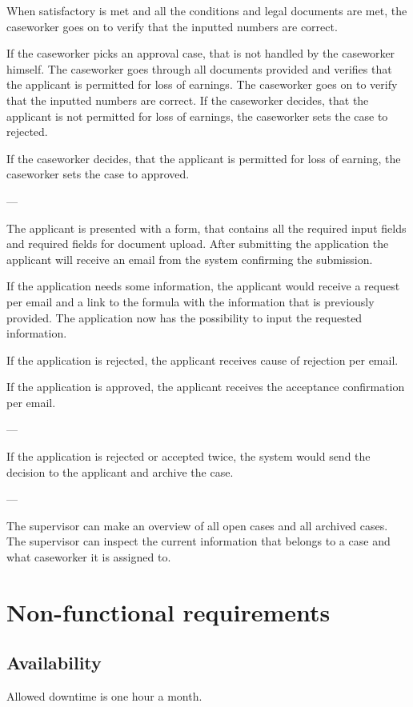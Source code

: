\documentclass{article}
\begin{document}
When satisfactory is met and all the conditions and legal documents are met, the caseworker goes on to verify that the inputted numbers are correct.

If the caseworker picks an approval case, that is not handled by the caseworker himself. The caseworker goes through all documents provided and verifies that the applicant is permitted for loss of earnings. The caseworker goes on to verify that the inputted numbers are correct.
If the caseworker decides, that the applicant is not permitted for loss of earnings, the caseworker sets the case to rejected.

If the caseworker decides, that the applicant is permitted for loss of earning, the caseworker sets the case to approved.

---

The applicant is presented with a form, that contains all the required input fields and required fields for document upload. After submitting the application the applicant will receive an email from the system confirming the submission.

If the application needs some information, the applicant would receive a request per email and a link to the formula with the information that is previously provided. The application now has the possibility to input the requested information. 

If the application is rejected, the applicant receives cause of rejection per email.

If the application is approved, the applicant receives the acceptance confirmation per email. 

---

If the application is rejected or accepted twice, the system would send the decision to the applicant and archive the case. 

---

The supervisor can make an overview of all open cases and all archived cases. The supervisor can inspect the current information that belongs to a case and what caseworker it is assigned to.

\section{Non-functional requirements}
\label{sec:nfr}

\subsection{Availability}
Allowed downtime is one hour a month.
\end{document}
